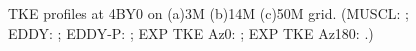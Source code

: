 \begin{figure}[t]
     \caption{TKE profiles at 4BY0 on (a)3M (b)14M (c)50M grid.  (MUSCL: \mline; EDDY: \eline; EDDY-P: \epline; EXP TKE Az0: \bluediam; EXP TKE Az180: \reddiam.)}
     \label{tke} 
\end{figure}
